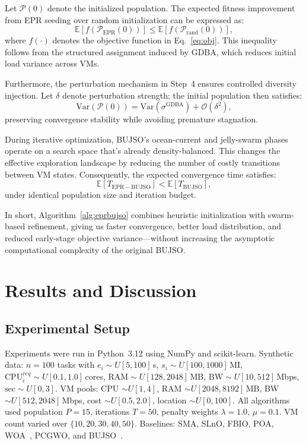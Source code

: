 \documentclass[journal]{IEEEtran}
\begin{document}
Let $\mathcal{P}(0)$ denote the initialized population. The expected fitness improvement from EPR seeding over random initialization can be expressed as:
\begin{equation}
\mathbb{E}[f(\mathcal{P}_{\mathrm{EPR}}(0))] \le \mathbb{E}[f(\mathcal{P}_{\mathrm{rand}}(0))],
\end{equation}
where $f(\cdot)$ denotes the objective function in Eq.~\eqref{eq:obj}. This inequality follows from the structured assignment induced by GDBA, which reduces initial load variance across VMs.

Furthermore, the perturbation mechanism in Step~4 ensures controlled diversity injection. Let $\delta$ denote perturbation strength; the initial population then satisfies:
\begin{equation}
\mathrm{Var}(\mathcal{P}(0)) = \mathrm{Var}(\sigma^{\mathrm{GDBA}}) + \mathcal{O}(\delta^2),
\end{equation}
preserving convergence stability while avoiding premature stagnation.

During iterative optimization, BUJSO's ocean-current and jelly-swarm phases operate on a search space that's already density-balanced. This changes the effective exploration landscape by reducing the number of costly transitions between VM states. Consequently, the expected convergence time satisfies:
\begin{equation}
\mathbb{E}[T_{\mathrm{EPR-BUJSO}}] < \mathbb{E}[T_{\mathrm{BUJSO}}],
\end{equation}
under identical population size and iteration budget.

In short, Algorithm~\ref{alg:eprbujso} combines heuristic initialization with swarm-based refinement, giving us faster convergence, better load distribution, and reduced early-stage objective variance---without increasing the asymptotic computational complexity of the original BUJSO.

\section{Results and Discussion}
\label{sec:results}

\subsection{Experimental Setup}

Experiments were run in Python~3.12 using NumPy and scikit-learn. Synthetic data: $n=100$ tasks with $e_i\!\sim\!U[5,100]$\,s, $s_i\!\sim\!U[100,1000]$\,MI, $\mathrm{CPU}^{req}_i\!\sim\!U[0.1,1.0]$\,cores, $\mathrm{RAM}\!\sim\!U[128,2048]$\,MB, $\mathrm{BW}\!\sim\!U[10,512]$\,Mbps, $\mathrm{sec}\!\sim\!U[0,3]$. VM pools: CPU $\sim\!U[1,4]$, RAM $\sim\!U[2048,8192]$\,MB, BW $\sim\!U[512,2048]$\,Mbps, cost $\sim\!U[0.5,2.0]$, location $\sim\!U[0,100]$. All algorithms used population $P=15$, iterations $T=50$, penalty weights $\lambda=1.0$, $\mu=0.1$. VM count varied over $\{10,20,30,40,50\}$. Baselines: SMA, SLnO, FBIO, POA, WOA~\cite{chen2020woa}, PCGWO, and BUJSO~\cite{pachipala2024}.
\end{document}

